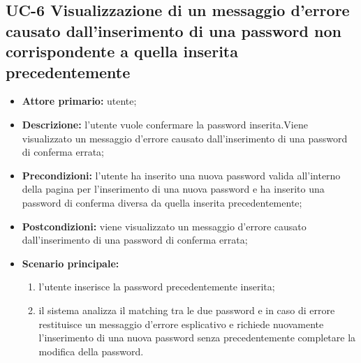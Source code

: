 \subsection{UC-6 Visualizzazione di un messaggio d'errore causato dall'inserimento di una password non corrispondente a quella inserita precedentemente}
\begin{itemize}
    \item \textbf{Attore primario:} utente;

    \item\textbf{Descrizione:} l'utente vuole confermare la password inserita.Viene visualizzato un messaggio d'errore causato dall'inserimento di una password di conferma errata;

    \item\textbf{Precondizioni:} l'utente ha inserito una nuova password valida all'interno della pagina per l'inserimento di una nuova password e ha inserito una password di conferma diversa da quella inserita precedentemente;

    \item\textbf{Postcondizioni:} viene visualizzato un messaggio d'errore causato dall'inserimento di una password di conferma errata;

    \item \textbf{Scenario principale:}
    \begin{enumerate}
          \item l'utente inserisce la password precedentemente inserita;
          \item il sistema analizza il matching tra le due password e in caso di errore restituisce un messaggio d'errore esplicativo e richiede nuovamente l'inserimento di una nuova password senza precedentemente completare la modifica della password.
    \end{enumerate}
\end{itemize}
